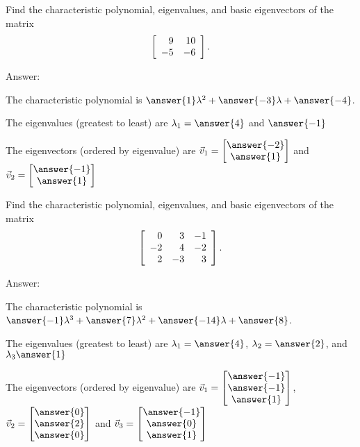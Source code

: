 \documentclass{ximera}
\author{Zack Reed}
\begin{document}
\begin{problem}
  Find the characteristic polynomial, eigenvalues, and basic
  eigenvectors of the matrix
  \begin{equation*}
    \startmat{rr}
      9 &  10 \\
      -5 &  -6 \\
    \stopmat.
  \end{equation*}

  Answer:

  The characteristic polynomial is $\answer{1}\lambda^2+\answer{-3}\lambda+\answer{-4}$.

  The eigenvalues (greatest to least) are $\lambda_1=\answer{4}$ and $\answer{-1}$

  The eigenvectors (ordered by eigenvalue) are $\vec{v}_1=\begin{bmatrix}
    \answer{-2}\\
    \answer{1}
  \end{bmatrix}$ and $\vec{v}_2=\begin{bmatrix}
    \answer{-1}\\
    \answer{1}
  \end{bmatrix}$
\end{problem}

\begin{problem}
  Find the characteristic polynomial, eigenvalues, and basic
  eigenvectors of the matrix
  \begin{equation*}
    \startmat{rrr}
      0 &   3 &  -1 \\
      -2 &   4 &  -2 \\
      2 &  -3 &   3 \\
    \stopmat.
  \end{equation*}

  Answer:

  The characteristic polynomial is $\answer{-1}\lambda^3+\answer{7}\lambda^2+\answer{-14}\lambda+\answer{8}$.

  The eigenvalues (greatest to least) are $\lambda_1=\answer{4}$, $\lambda_2=\answer{2}$, and $\lambda_3\answer{1}$

  The eigenvectors (ordered by eigenvalue) are $\vec{v}_1=\begin{bmatrix}
    \answer{-1}\\
    \answer{-1} \\
    \answer{1}
  \end{bmatrix}$, $\vec{v}_2=\begin{bmatrix}
    \answer{0}\\
    \answer{2}\\
    \answer{0}
  \end{bmatrix}$ and $\vec{v}_3=\begin{bmatrix}
    \answer{-1}\\
    \answer{0}\\
    \answer{1}
  \end{bmatrix}$
\end{problem}
\end{document}
